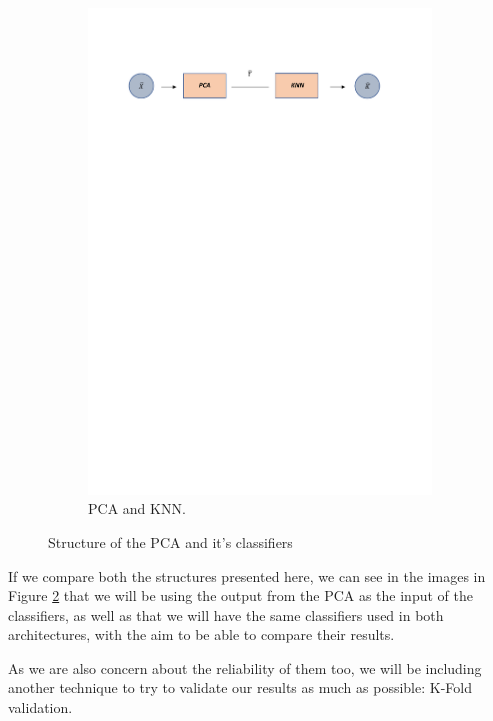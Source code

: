 \begin{figure}[H]
\begin{subfigure}{1\linewidth} 
  \centering
  \includegraphics[width=\linewidth]{Figuras_tfg/Diagram_pca_KNN}
  \caption{PCA and KNN.}
  \label{fig:FigB_PCA_KNN} 
\end{subfigure}
  \caption{Structure of the PCA and it's classifiers}
 \label{fig:PCA_architecture}
\end{figure}

If we compare both the structures presented here, we can see in the images in Figure \ref{fig:PCA_architecture} that we will be using the output from the PCA as the input of the classifiers, as well as that we will have the same classifiers used in both architectures, with the aim to be able to compare their results.\par

As we are also concern about the reliability of them too, we will be including another technique to try to validate our results as much as possible: K-Fold validation. \par

